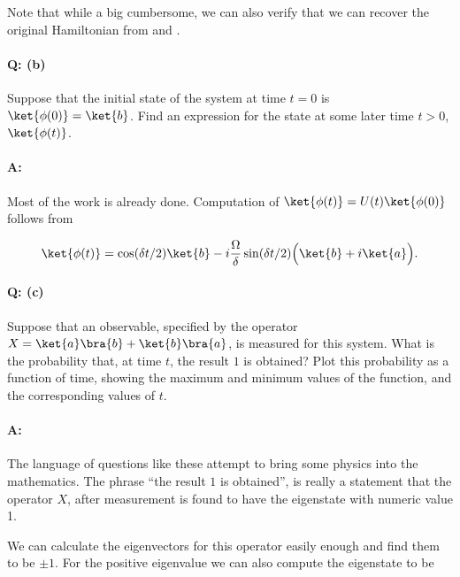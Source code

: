 {Note that while a big cumbersome, we can also verify that we can recover the original Hamiltonian from  and .

\paragraph{Q: (b)}

Suppose that the initial state of the system at time \(t = 0\) is \(\ket{\phi(0)}= \ket{b}\).  Find an expression for the state at some later time \(t > 0\), \(\ket{\phi(t)}\).

\paragraph{A:}

Most of the work is already done.  Computation of \(\ket{\phi(t)} = U(t) \ket{\phi(0)}\) follows from 

\begin{equation}\label{eqn:qmIexamPractice2008Dec:2:110}
\ket{\phi(t)} =
\cos(\delta t/2) \ket{b}
- i \frac{\Omega}{\delta} \sin(\delta t/2) \Bigl( 
\ket{b} +i \ket{a}
\Bigr).
\end{equation}

\paragraph{Q: (c)}

Suppose that an observable, specified by the operator \(X = \ket{a}\bra{b} + \ket{b}\bra{a}\), is measured for this system.  What is the probability that, at time \(t\), the result \(1\) is obtained?  Plot this probability as a function of time, showing the maximum and minimum values of the function, and the corresponding values of \(t\).

\paragraph{A:}

The language of questions like these attempt to bring some physics into the mathematics.  The phrase ``the result \(1\) is obtained'', is really a statement that the operator \(X\), after measurement is found to have the eigenstate with numeric value 1.

We can calculate the eigenvectors for this operator easily enough and find them to be \(\pm 1\).  For the positive eigenvalue we can also compute the eigenstate to be

}
